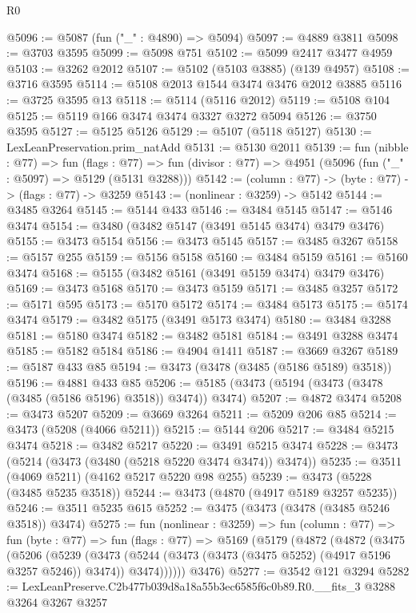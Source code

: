 \begin{lexlean}{R0}
\begin{coremodule}
@5096 := @5087 (fun ("_" : @4890) => @5094)
@5097 := @4889 @3811
@5098 := @3703 @3595
@5099 := @5098 @751
@5102 := @5099 @2417 @3477 @4959
@5103 := @3262 @2012
@5107 := @5102 (@5103 @3885) (@139 @4957)
@5108 := @3716 @3595
@5114 := @5108 @2013 @1544 @3474 @3476 @2012 @3885
@5116 := @3725 @3595 @13
@5118 := @5114 (@5116 @2012)
@5119 := @5108 @104
@5125 := @5119 @166 @3474 @3474 @3327 @3272 @5094
@5126 := @3750 @3595
@5127 := @5125 @5126
@5129 := @5107 (@5118 @5127)
@5130 := LexLeanPreservation.prim_natAdd
@5131 := @5130 @2011
@5139 := fun (nibble : @77) =>
  fun (flags : @77) =>
  fun (divisor : @77) => @4951 (@5096 (fun ("_" : @5097) => @5129 (@5131 @3288)))
@5142 := (column : @77) -> (byte : @77) -> (flags : @77) -> @3259
@5143 := (nonlinear : @3259) -> @5142
@5144 := @3485 @3264
@5145 := @5144 @433
@5146 := @3484 @5145
@5147 := @5146 @3474
@5154 := @3480 (@3482 @5147 (@3491 @5145 @3474) @3479 @3476)
@5155 := @3473 @5154
@5156 := @3473 @5145
@5157 := @3485 @3267
@5158 := @5157 @255
@5159 := @5156 @5158
@5160 := @3484 @5159
@5161 := @5160 @3474
@5168 := @5155 (@3482 @5161 (@3491 @5159 @3474) @3479 @3476)
@5169 := @3473 @5168
@5170 := @3473 @5159
@5171 := @3485 @3257
@5172 := @5171 @595
@5173 := @5170 @5172
@5174 := @3484 @5173
@5175 := @5174 @3474
@5179 := @3482 @5175 (@3491 @5173 @3474)
@5180 := @3484 @3288
@5181 := @5180 @3474
@5182 := @3482 @5181
@5184 := @3491 @3288 @3474
@5185 := @5182 @5184
@5186 := @4904 @1411
@5187 := @3669 @3267
@5189 := @5187 @433 @85
@5194 := @3473 (@3478 (@3485 (@5186 @5189) @3518))
@5196 := @4881 @433 @85
@5206 := @5185 (@3473 (@5194 (@3473 (@3478 (@3485 (@5186 @5196) @3518)) @3474)) @3474)
@5207 := @4872 @3474
@5208 := @3473 @5207
@5209 := @3669 @3264
@5211 := @5209 @206 @85
@5214 := @3473 (@5208 (@4066 @5211))
@5215 := @5144 @206
@5217 := @3484 @5215 @3474
@5218 := @3482 @5217
@5220 := @3491 @5215 @3474
@5228 := @3473 (@5214 (@3473 (@3480 (@5218 @5220 @3474 @3474)) @3474))
@5235 := @3511 (@4069 @5211) (@4162 @5217 @5220 @98 @255)
@5239 := @3473 (@5228 (@3485 @5235 @3518))
@5244 := @3473 (@4870 (@4917 @5189 @3257 @5235))
@5246 := @3511 @5235 @615
@5252 := @3475 (@3473 (@3478 (@3485 @5246 @3518)) @3474)
@5275 := fun (nonlinear : @3259) =>
  fun (column : @77) =>
  fun (byte : @77) =>
  fun (flags : @77) =>
  @5169
    (@5179
      (@4872
        (@4872
          (@3475
            (@5206
              (@5239
                (@3473
                  (@5244 (@3473 (@3473 (@3475 @5252) (@4917 @5196 @3257 @5246)) @3474))
                  @3474))))))
      @3476)
@5277 := @3542 @121 @3294
@5282 := LexLeanPreserve.C2b477b039d8a18a55b3ec6585f6c0b89.R0.__fits_3 @3288 @3264 @3267 @3257

\end{coremodule}
\end{lexlean}
